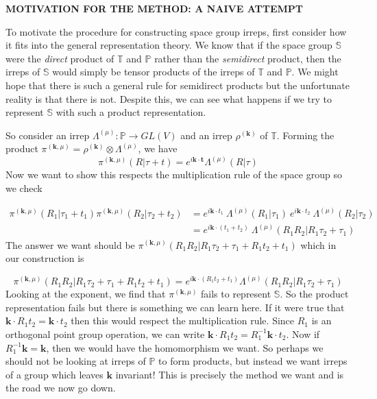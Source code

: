 \documentclass[9 pt]{report}
\def\*#1{\boldsymbol{#1}}
\begin{document}
\newpage

\begin{center}
	\textbf{MOTIVATION FOR THE METHOD: A NAIVE ATTEMPT}
\end{center}
To motivate the procedure for constructing space group irreps, first consider how it fits into the general representation theory. We know that if the space group $\mathbb{S}$ were the \emph{direct} product of $\mathbb{T}$ and $\mathbb{P}$ rather than the \emph{semidirect} product, then the irreps of $\mathbb{S}$ would simply be tensor products of the irreps of $\mathbb{T}$ and $\mathbb{P}$. We might hope that there is such a general rule for semidirect products but the unfortunate reality is that there is not. Despite this, we can see what happens if we try to represent $\mathbb{S}$ with such a product representation. 

So consider an irrep $\Lambda^{(\mu)}: \mathbb{P}\to GL(V)$ and an irrep $\rho^{(\*k)}$ of $\mathbb{T}$. Forming the product $\pi^{(\*k,\mu)} = \rho^{(\*k)}\otimes \Lambda^{(\mu)}$, we have 
$$\pi^{(\*k,\mu)}(R|\tau+t) = e^{i\*k\cdot\*t}\Lambda^{(\mu)}(R|\tau)$$ 
Now we want to show this respects the multiplication rule of the space group so we check

\begin{align}
 \pi^{(\*k,\mu)}(R_1|\tau_1 + t_1)\pi^{(\*k,\mu)}(R_2|\tau_2 + t_2)   &= e^{i\*k\cdot t_1}\:\Lambda^{(\mu)}(R_1|\tau_1)\: e^{i\*k\cdot t_2}\:\Lambda^{(\mu)}(R_2|\tau_2)
\nonumber	\\
 & = e^{i\*k \cdot(t_1 + t_2)}\:\Lambda^{(\mu)}(R_1R_2|R_1\tau_2 + \tau_1) 
 \nonumber
\end{align}
The answer we want should be $\pi^{(\*k,\mu)}(R_1R_2|R_1\tau_2 + \tau_1 + R_1 t_2 + t_1)$ which in our construction is

$$ \pi^{(\*k,\mu)}(R_1R_2|R_1\tau_2 + \tau_1 + R_1 t_2 + t_1) = e^{i\*k\cdot(R_1t_2 + t_1)}\Lambda^{(\mu)}(R_1R_2|R_1\tau_2 + \tau_1) $$
Looking at the exponent, we find that $\pi^{(\*k,\mu)}$ fails to represent $\mathbb{S}$. So the product representation fails but there is something we can learn here. If it were true that $\*k\cdot R_1 t_2 = \*k\cdot t_2$ then this would respect the multiplication rule. Since $R_1$ is an orthogonal point group operation, we can write $\*k\cdot R_1t_2 = R_1^{-1}\*k\cdot t_2$. Now if $R_1^{-1}\*k = \*k$, then we would have the homomorphism we want. So perhaps we should not be looking at irreps of $\mathbb{P}$ to form products, but instead we want irreps of a group which leaves $\*k$ invariant! This is precisely the method we want and is the road we now go down.
\\
\\
\end{document}
